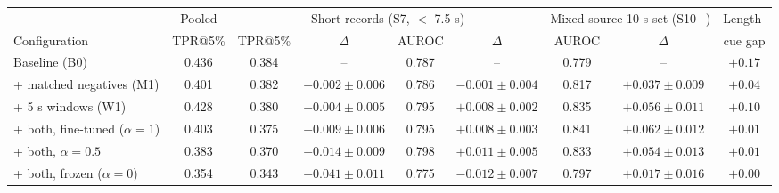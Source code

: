 \begin{tabular}{l c c c c c c c c}
\hline
 & Pooled & \multicolumn{4}{c}{Short records (S7, $<$ 7.5 s)} & \multicolumn{2}{c}{Mixed-source 10 s set (S10+)} & Length- \\
Configuration & TPR@5\% & TPR@5\% & $\Delta$ & AUROC & $\Delta$ & AUROC & $\Delta$ & cue gap \\
\hline
Baseline (B0) & 0.436 & 0.384 & -- & 0.787 & -- & 0.779 & -- & $+0.17$ \\
+ matched negatives (M1) & 0.401 & 0.382 & $-0.002 \pm 0.006$ & 0.786 & $-0.001 \pm 0.004$ & 0.817 & $+0.037 \pm 0.009$ & $+0.04$ \\
+ 5 s windows (W1) & 0.428 & 0.380 & $-0.004 \pm 0.005$ & 0.795 & $+0.008 \pm 0.002$ & 0.835 & $+0.056 \pm 0.011$ & $+0.10$ \\
+ both, fine-tuned ($\alpha=1$) & 0.403 & 0.375 & $-0.009 \pm 0.006$ & 0.795 & $+0.008 \pm 0.003$ & 0.841 & $+0.062 \pm 0.012$ & $+0.01$ \\
+ both, $\alpha=0.5$ & 0.383 & 0.370 & $-0.014 \pm 0.009$ & 0.798 & $+0.011 \pm 0.005$ & 0.833 & $+0.054 \pm 0.013$ & $+0.01$ \\
+ both, frozen ($\alpha=0$) & 0.354 & 0.343 & $-0.041 \pm 0.011$ & 0.775 & $-0.012 \pm 0.007$ & 0.797 & $+0.017 \pm 0.016$ & $+0.00$ \\
\hline
\end{tabular}
